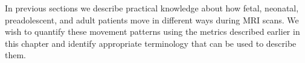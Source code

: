 In previous sections we describe practical knowledge about how fetal, neonatal, preadolescent, and adult patients move in different ways during MRI scans. We wish to quantify these movement patterns using the metrics described earlier in this chapter and identify appropriate terminology that can be used to describe them.










